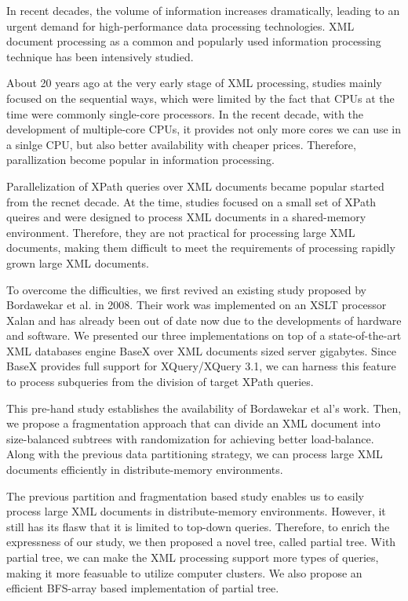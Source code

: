 \begin{abstracts}
	
	In recent decades, the volume of information increases dramatically, leading to
	an urgent demand for high-performance data processing technologies. XML document
	processing as a common and popularly used information processing technique has
	been intensively studied.
	
	About 20 years ago at the very early stage of XML processing, studies mainly
	focused on the sequential ways,  which were limited by the fact that CPUs at
	the time were commonly single-core processors. In the recent decade, with the
	development of multiple-core CPUs, it provides not only more cores we can use
	in a sinlge CPU, but also better availability with cheaper prices.  Therefore,
	parallization become popular in information processing.
	
	Parallelization of XPath queries over XML documents became popular started from
	the recnet decade. At the time, studies focused on a small set of XPath queires
	and were designed to process XML documents in a shared-memory environment.
	Therefore, they are not practical for processing large XML documents, making
	them difficult to meet the requirements of processing rapidly grown large XML
	documents.
	
	To overcome the difficulties, we first revived an existing study proposed by
	Bordawekar et al. in 2008. Their work was implemented on an XSLT processor Xalan
	and has already been out of date now due to the developments of hardware and
	software. We presented our three implementations on top of a state-of-the-art
	XML databases engine BaseX over XML documents sized server gigabytes. Since
	BaseX provides full support for XQuery/XQuery 3.1, we can harness this feature
	to process subqueries from the division of target XPath queries.
	
	This pre-hand study establishes the availability of Bordawekar et al's work.
	Then, we propose a fragmentation approach that can divide an XML document into
	size-balanced subtrees with randomization for achieving better load-balance.
	Along with the previous data partitioning strategy, we can process large XML
	documents efficiently in distribute-memory environments.
	
	The previous partition and fragmentation based study enables us to easily
	process  large XML documents in distribute-memory environments. However, it
	still has its  flasw that it is limited to top-down queries. Therefore, to
	enrich the expressness  of our study, we then proposed a novel tree, called
	partial tree. With partial tree, we can make the XML processing support more
	types of queries, making it more feasuable to utilize computer clusters. We also
	propose an efficient BFS-array based implementation of partial tree.
	

\end{abstracts}
